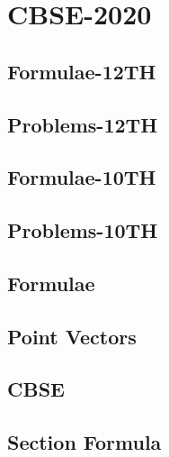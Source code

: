 \documentclass[journal]{IEEEtran}
\begin{document}
	\newpage
	
	
	\tableofcontents
	
	\newpage
	\onecolumn
	
	
	\renewcommand{\thetable}{\theenumi}
	
	\section{CBSE-2020}
	\subsection{Formulae-12TH}
	
	\subsection{Problems-12TH}
	
	\newpage
	\subsection{Formulae-10TH}
	
	\subsection{Problems-10TH}
	
	\iffalse
	\subsection{Formulae}
	
	\subsection{Point Vectors}
	
	\subsection{CBSE}
	
	\subsection{Section Formula}
	
\end{document}
